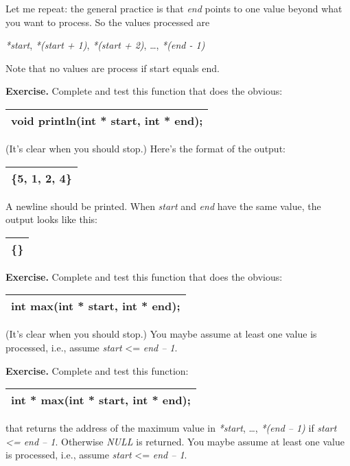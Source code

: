 \documentclass[
]{article}
\begin{document}
Let me repeat: the general practice is that \emph{end} points to one
value beyond what you want to process. So the values processed are

\emph{*start}, \emph{*(start + 1)}, \emph{*(start + 2)}, \ldots,
\emph{*(end - 1)}

Note that no values are process if start equals end.

\textbf{Exercise.} Complete and test this function that does the
obvious:

\begin{longtable}[]{@{}l@{}}
\toprule
\endhead
void println(int * start, int * end);\tabularnewline
\bottomrule
\end{longtable}

(It's clear when you should stop.) Here's the format of the output:

\begin{longtable}[]{@{}l@{}}
\toprule
\endhead
\{5, 1, 2, 4\}\tabularnewline
\bottomrule
\end{longtable}

A newline should be printed. When \emph{start} and \emph{end} have the
same value, the output looks like this:

\begin{longtable}[]{@{}l@{}}
\toprule
\endhead
\{\}\tabularnewline
\bottomrule
\end{longtable}

\textbf{Exercise.} Complete and test this function that does the
obvious:

\begin{longtable}[]{@{}l@{}}
\toprule
\endhead
int max(int * start, int * end);\tabularnewline
\bottomrule
\end{longtable}

(It's clear when you should stop.) You maybe assume at least one value
is processed, i.e., assume \emph{start} \textless= \emph{end -- 1}.

\textbf{Exercise.} Complete and test this function:

\begin{longtable}[]{@{}l@{}}
\toprule
\endhead
int * max(int * start, int * end);\tabularnewline
\bottomrule
\end{longtable}

that returns the address of the maximum value in \emph{*start}, \ldots,
\emph{*(end -- 1)} if \emph{start \textless= end -- 1}. Otherwise
\emph{NULL} is returned. You maybe assume at least one value is
processed, i.e., assume \emph{start} \textless= \emph{end -- 1}.
\end{document}
